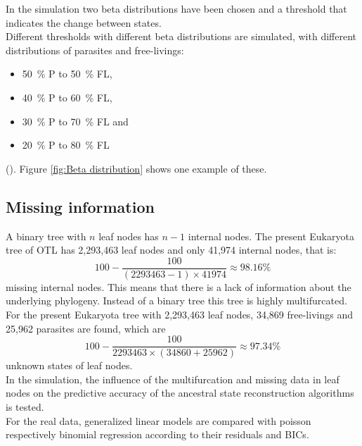       In the simulation two beta distributions have been chosen and a threshold that indicates the change 
        between states. \\
      Different thresholds with different beta distributions are simulated, with different distributions 
        of parasites and free-livings:
        \begin{itemize}
          \item 50~\% P to 50~\% FL,
          \item 40~\% P to 60~\% FL,
          \item 30~\% P to 70~\% FL and 
          \item 20~\% P to 80~\% FL
        \end{itemize}
        (). Figure \ref{fig:Beta distribution} 
        shows one example of these. \\

    \subsection{Missing information}

      A binary tree with $n$ leaf nodes has $n-1$ internal nodes. The present Eukaryota tree of OTL has 
        2,293,463 leaf nodes and only 41,974 internal nodes, that is:
      $$100-\frac{100}{(2293463-1) \times 41974} \approx 98.16 \%$$
        missing internal nodes. This means that there is a lack of information about the underlying 
        phylogeny. Instead of a binary tree this tree is highly multifurcated. \\


      For the present Eukaryota tree with 2,293,463 leaf nodes, 34,869 free-livings and 25,962 parasites 
        are found, which are
        $$100-\frac{100}{2293463 \times (34860+25962)} \approx 97.34 \%$$
        unknown states of leaf nodes. \\

      In the simulation, the influence of the multifurcation and missing data in leaf nodes on the 
        predictive accuracy of the ancestral state reconstruction algorithms is tested. \\
      For the real data, generalized linear models are compared with poisson respectively binomial 
        regression according to their residuals and BICs. \\
       \\

